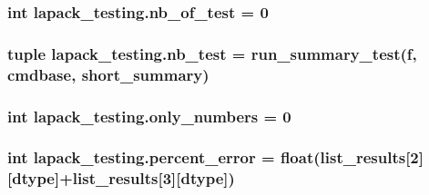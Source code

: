 \subsubsection[{nb\+\_\+of\+\_\+test}]{\setlength{\rightskip}{0pt plus 5cm}int lapack\+\_\+testing.\+nb\+\_\+of\+\_\+test = 0}\label{namespacelapack__testing_a13eed2214e37dac5dfcccc85bb54e0ff}
\hypertarget{namespacelapack__testing_aad881dcf1f0a6c09253c6542e03c4eba}{}
\subsubsection[{nb\+\_\+test}]{\setlength{\rightskip}{0pt plus 5cm}tuple lapack\+\_\+testing.\+nb\+\_\+test = {\bf run\+\_\+summary\+\_\+test}({\bf f}, {\bf cmdbase}, {\bf short\+\_\+summary})}\label{namespacelapack__testing_aad881dcf1f0a6c09253c6542e03c4eba}
\hypertarget{namespacelapack__testing_a75639e8762c6fd4dc5833cdcc2216df0}{}
\subsubsection[{only\+\_\+numbers}]{\setlength{\rightskip}{0pt plus 5cm}int lapack\+\_\+testing.\+only\+\_\+numbers = 0}\label{namespacelapack__testing_a75639e8762c6fd4dc5833cdcc2216df0}
\hypertarget{namespacelapack__testing_aac199e91bde8f5bcce6e8f16b5f02406}{}
\subsubsection[{percent\+\_\+error}]{\setlength{\rightskip}{0pt plus 5cm}int lapack\+\_\+testing.\+percent\+\_\+error = float({\bf list\+\_\+results}\mbox{[}2\mbox{]}\mbox{[}dtype\mbox{]}+{\bf list\+\_\+results}\mbox{[}3\mbox{]}\mbox{[}dtype\mbox{]})}\label{namespacelapack__testing_aac199e91bde8f5bcce6e8f16b5f02406}
\hypertarget{namespacelapack__testing_a285006456d0680d9855bef59e84672fe}{}
